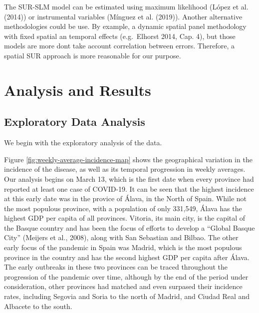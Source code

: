 \documentclass[]{elsarticle} %
\begin{document}
The SUR-SLM model can be estimated using maximum likelihood (López et
al. (2014)) or instrumental variables (Mínguez et al. (2019)). Another
alternative methodologies could be use. By example, a dynamic spatial
panel methodology with fixed spatial an temporal effects (e.g.~Elhorst
2014, Cap. 4), but those models are more dont take account correlation
between errors. Therefore, a spatial SUR approach is more reasonable for
our purpose.

\hypertarget{analysis-and-results}{%
\section{Analysis and Results}\label{analysis-and-results}}

\hypertarget{exploratory-data-analysis}{%
\subsection{Exploratory Data Analysis}\label{exploratory-data-analysis}}

We begin with the exploratory analysis of the data.

Figure \ref{fig:weekly-average-incidence-map} shows the geographical
variation in the incidence of the disease, as well as its temporal
progression in weekly averages. Our analysis begins on March 13, which
is the first date when every province had reported at least one case of
COVID-19. It can be seen that the highest incidence at this early date
was in the provice of Álava, in the North of Spain. While not the most
populous province, with a population of only 331,549, Álava has the
highest GDP per capita of all provinces. Vitoria, its main city, is the
capital of the Basque country and has been the focus of efforts to
develop a ``Global Basque City'' (Meijers et al., 2008), along with San
Sebastian and Bilbao. The other early focus of the pandemic in Spain was
Madrid, which is the most populous province in the country and has the
second highest GDP per capita after Álava. The early outbreaks in these
two provinces can be traced throughout the progression of the pandemic
over time, although by the end of the period under consideration, other
provinces had matched and even surpased their incidence rates, including
Segovia and Soria to the north of Madrid, and Ciudad Real and Albacete
to the south.
\end{document}
